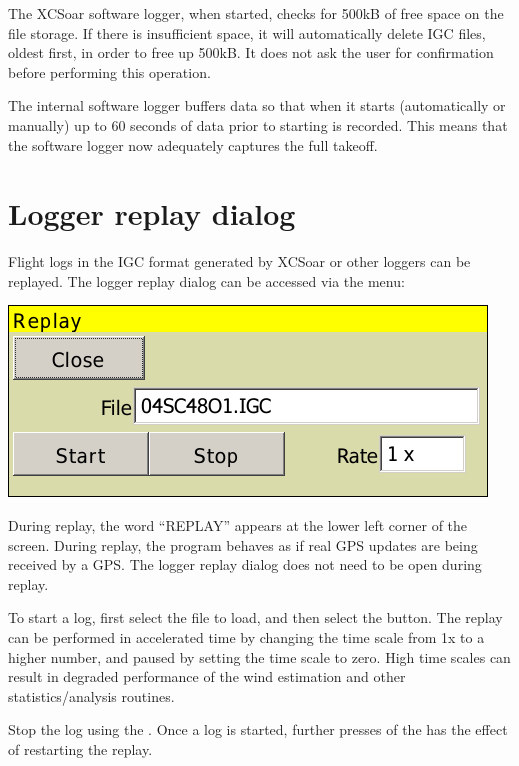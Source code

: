 \documentclass[a4paper,12pt]{refrep}
\begin{document}
The XCSoar software logger, when started, checks for 500kB of free
space on the file storage.  If there is insufficient space, it will
automatically delete IGC files, oldest first, in order to free up
500kB.  It does not ask the user for confirmation before performing
this operation.

The internal software logger buffers data so that when it starts
(automatically or manually) up to 60 seconds of data prior to starting
is recorded.  This means that the software logger now adequately
captures the full takeoff.

\section{Logger replay dialog}

Flight logs in the IGC format generated by XCSoar or other loggers can
be replayed.  The logger replay dialog can be accessed via the
menu:
\begin{quote}
\blink{}\blink{}
\end{quote}

\begin{center}
\includegraphics[angle=0,width=0.7\linewidth,keepaspectratio='true']{figures/loggerreplay.png}
\end{center}

During replay, the word ``REPLAY'' appears at the lower left corner of
the screen.  During replay, the program behaves as if real GPS updates
are being received by a GPS.  The logger replay dialog does not need
to be open during replay.

To start a log, first select the file to load, and then select the
 button.  The replay can be performed in accelerated time
by changing the time scale from 1x to a higher number, and paused by
setting the time scale to zero.  High time scales can result in degraded
performance of the wind estimation and other statistics/analysis routines.

Stop the log using the .
Once a log is started, further presses of the  has the
effect of restarting the replay.
\end{document}

